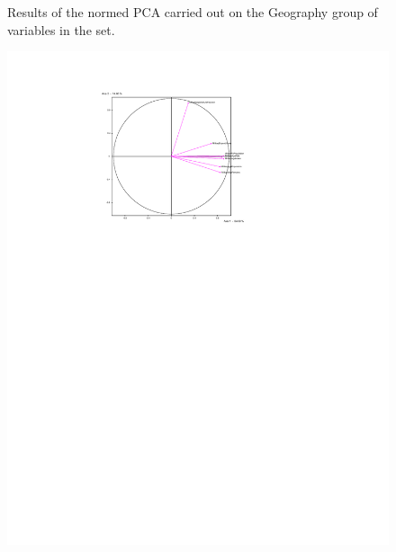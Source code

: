 \documentclass[a4paper,10pt,twocolumn]{article}
\begin{document}
\begin{figure}[!ht]
\begin{center}
\caption{\footnotesize{Results of the normed PCA carried out on the Geography group of variables in the set.}\label{p5}}
\end{center}
\end{figure}

\begin{figure}[!ht]
\begin{center}
\includegraphics[width=16cm]{p6a.pdf}

\end{center}
\end{figure}
\end{document}
